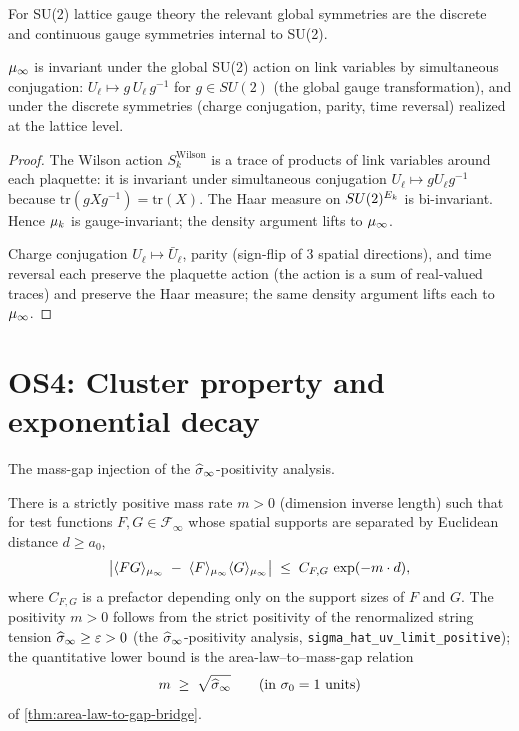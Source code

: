 For SU(2) lattice gauge theory the relevant global symmetries are
the discrete and continuous gauge symmetries internal to SU(2).

\begin{theorem}
\label{thm:os3}
$\mu_\infty$ is invariant under the global SU(2) action on link
variables by simultaneous conjugation:
$U_\ell \mapsto g \, U_\ell \, g^{-1}$ for $g \in SU(2)$ (the global
gauge transformation), and under the discrete symmetries (charge
conjugation, parity, time reversal) realized at the lattice level.
\end{theorem}

\begin{proof}
The Wilson action $S_k^{\mathrm{Wilson}}$ is a trace of products of
link variables around each plaquette: it is invariant under
simultaneous conjugation $U_\ell \mapsto g U_\ell g^{-1}$ because
$\mathrm{tr}(g X g^{-1}) = \mathrm{tr}(X)$.  The Haar measure on
$SU(2)^{E_k}$ is bi-invariant.  Hence $\mu_k$ is gauge-invariant; the
density argument lifts to $\mu_\infty$.

Charge conjugation $U_\ell \mapsto \bar U_\ell$, parity (sign-flip
of 3 spatial directions), and time reversal each preserve the
plaquette action (the action is a sum of real-valued traces) and
preserve the Haar measure; the same density argument lifts each to
$\mu_\infty$.
\end{proof}

\section{OS4: Cluster property and exponential decay}
\label{sec:os4}

The mass-gap injection of the $\widehat{\sigma}_\infty$-positivity analysis.

\begin{theorem}
\label{thm:os4}
There is a strictly positive mass rate $m > 0$ (dimension inverse
length) such that for test functions $F, G \in \mathcal{F}_\infty$
whose spatial supports are separated by Euclidean distance
$d \ge a_0$,
\begin{equation*}
  \bigl| \langle F G \rangle_{\mu_\infty} \;-\;
         \langle F \rangle_{\mu_\infty} \langle G \rangle_{\mu_\infty} \bigr|
  \;\le\;
  C_{F,G} \, \exp(-m \cdot d),
\end{equation*}
where $C_{F,G}$ is a prefactor depending only on the support sizes of
$F$ and $G$.  The positivity $m > 0$ follows from the strict
positivity of the renormalized string tension $\widehat{\sigma}_\infty \ge
\varepsilon > 0$ (the $\widehat{\sigma}_\infty$-positivity analysis,
\texttt{sigma\_hat\_uv\_limit\_positive}); the quantitative lower
bound is the area-law--to--mass-gap relation
\begin{equation}
  \label{eq:os4-mass-bound}
  m \;\ge\; \sqrt{\widehat{\sigma}_\infty} \qquad (\text{in } \sigma_0 = 1 \text{ units})
\end{equation}
of \cref{thm:area-law-to-gap-bridge}.
\end{theorem}

